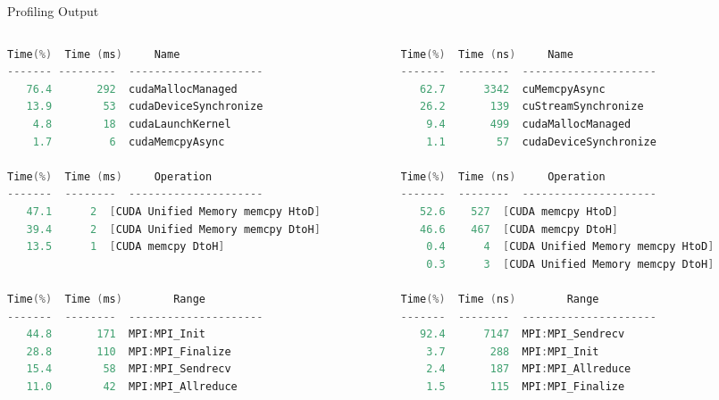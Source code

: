 \documentclass[
  english,            %
  aspectratio=169,    %
  11pt
]{tumbeamer}
\begin{document}
\begin{frame}[fragile]{Profiling Output}
\begin{columns}
	\begin{column}{.48\textwidth}
\tiny
\begin{lstlisting}[frame=single,language=C++,caption={2 MPI}, captionpos=b]
Time(%)  Time (ms)     Name    
------- ---------  ---------------------
   76.4       292  cudaMallocManaged    
   13.9        53  cudaDeviceSynchronize
    4.8        18  cudaLaunchKernel    
    1.7         6  cudaMemcpyAsync  
      
Time(%)  Time (ms)     Operation    
-------  --------  ---------------------
   47.1      2  [CUDA Unified Memory memcpy HtoD]
   39.4      2  [CUDA Unified Memory memcpy DtoH]
   13.5      1  [CUDA memcpy DtoH] 
     

Time(%)  Time (ms)        Range
-------  --------  ---------------------
   44.8       171  MPI:MPI_Init
   28.8       110  MPI:MPI_Finalize
   15.4        58  MPI:MPI_Sendrecv
   11.0        42  MPI:MPI_Allreduce
\end{lstlisting}		
	\end{column}
	\begin{column}{.48\textwidth}
\tiny
\begin{lstlisting}[frame=single,language=C++,caption={4 MPI}, captionpos=b]
Time(%)  Time (ns)     Name    
-------  --------  ---------------------
   62.7      3342  cuMemcpyAsync    
   26.2       139  cuStreamSynchronize  
    9.4       499  cudaMallocManaged    
    1.1        57  cudaDeviceSynchronize
    
Time(%)  Time (ns)     Operation
-------  --------  ---------------------
   52.6    527  [CUDA memcpy HtoD]
   46.6    467  [CUDA memcpy DtoH]
    0.4      4  [CUDA Unified Memory memcpy HtoD]
    0.3      3  [CUDA Unified Memory memcpy DtoH]
    
Time(%)  Time (ns)        Range
-------  --------  ---------------------
   92.4      7147  MPI:MPI_Sendrecv
    3.7       288  MPI:MPI_Init
    2.4       187  MPI:MPI_Allreduce
    1.5       115  MPI:MPI_Finalize
\end{lstlisting}	
	\end{column}
\end{columns}


\end{frame}

\end{document}
